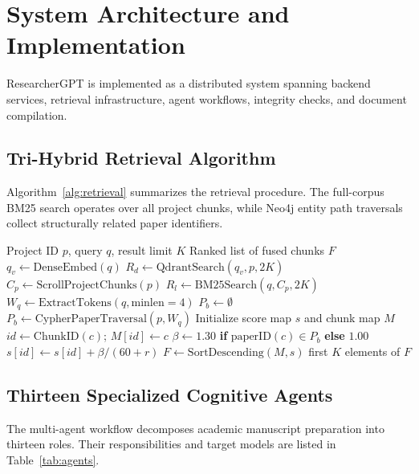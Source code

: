\documentclass[conference]{IEEEtran}
\begin{document}
\section{System Architecture and Implementation}
ResearcherGPT is implemented as a distributed system spanning backend services, retrieval infrastructure, agent workflows, integrity checks, and document compilation.

\subsection{Tri-Hybrid Retrieval Algorithm}
Algorithm~\ref{alg:retrieval} summarizes the retrieval procedure. The full-corpus BM25 search operates over all project chunks, while Neo4j entity path traversals collect structurally related paper identifiers.

\begin{algorithm}[!t]
\caption{Tri-Hybrid RRF Retrieval with Knowledge-Graph Boosting}
\label{alg:retrieval}
\begin{algorithmic}[1]
\Require Project ID $p$, query $q$, result limit $K$
\Ensure Ranked list of fused chunks $F$
\State $q_v \gets \mathrm{DenseEmbed}(q)$
\State $R_d \gets \mathrm{QdrantSearch}(q_v, p, 2K)$
\State $C_p \gets \mathrm{ScrollProjectChunks}(p)$
\State $R_l \gets \mathrm{BM25Search}(q, C_p, 2K)$
\State $W_q \gets \mathrm{ExtractTokens}(q, \mathrm{minlen}=4)$
\State $P_b \gets \emptyset$
  \State $P_b \gets \mathrm{CypherPaperTraversal}(p, W_q)$
\EndIf
\State Initialize score map $s$ and chunk map $M$
    \State $id \gets \mathrm{ChunkID}(c)$; $M[id] \gets c$
    \State $\beta \gets 1.30$ \textbf{if} $\mathrm{paperID}(c) \in P_b$ \textbf{else} $1.00$
    \State $s[id] \gets s[id] + \beta / (60 + r)$
  \EndFor
\EndFor
\State $F \gets \mathrm{SortDescending}(M, s)$
\State \Return first $K$ elements of $F$
\end{algorithmic}
\end{algorithm}

\subsection{Thirteen Specialized Cognitive Agents}
The multi-agent workflow decomposes academic manuscript preparation into thirteen roles. Their responsibilities and target models are listed in Table~\ref{tab:agents}.
\end{document}
